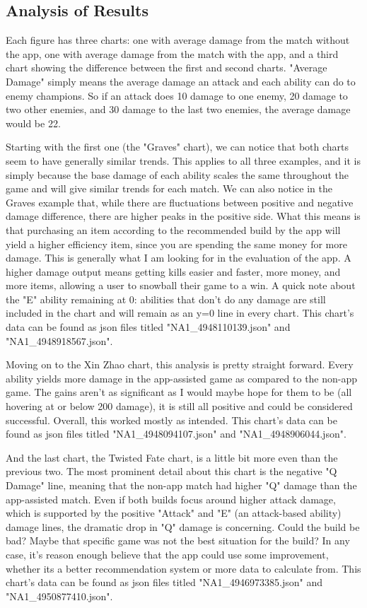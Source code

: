 \documentclass[10pt,twocolumn]{article}
\begin{document}
\subsection{Analysis of Results}
Each figure has three charts: one with average damage from the match without the app, one with average damage from the match with the app, and a third chart showing the difference between the first and second charts.
"Average Damage" simply means the average damage an attack and each ability can do to enemy champions.
So if an attack does 10 damage to one enemy, 20 damage to two other enemies, and 30 damage to the last two enemies, the average damage would be 22.

Starting with the first one (the "Graves" chart), we can notice that both charts seem to have generally similar trends.
This applies to all three examples, and it is simply because the base damage of each ability scales the same throughout the game and will give similar trends for each match.
We can also notice in the Graves example that, while there are fluctuations between positive and negative damage difference, there are higher peaks in the positive side.
What this means is that purchasing an item according to the recommended build by the app will yield a higher efficiency item, since you are spending the same money for more damage.
This is generally what I am looking for in the evaluation of the app.
A higher damage output means getting kills easier and faster, more money, and more items, allowing a user to snowball their game to a win.
A quick note about the "E" ability remaining at 0: abilities that don't do any damage are still included in the chart and will remain as an y=0 line in every chart.
This chart's data can be found as json files titled "NA1\_4948110139.json" and "NA1\_4948918567.json".

Moving on to the Xin Zhao chart, this analysis is pretty straight forward.
Every ability yields more damage in the app-assisted game as compared to the non-app game.
The gains aren't as significant as I would maybe hope for them to be (all hovering at or below 200 damage), it is still all positive and could be considered successful.
Overall, this worked mostly as intended.
This chart's data can be found as json files titled "NA1\_4948094107.json" and "NA1\_4948906044.json".

And the last chart, the Twisted Fate chart, is a little bit more even than the previous two.
The most prominent detail about this chart is the negative "Q Damage" line, meaning that the non-app match had higher "Q" damage than the app-assisted match.
Even if both builds focus around higher attack damage, which is supported by the positive "Attack" and "E" (an attack-based ability) damage lines, the dramatic drop in "Q" damage is concerning.
Could the build be bad?
Maybe that specific game was not the best situation for the build?
In any case, it's reason enough believe that the app could use some improvement, whether its a better recommendation system or more data to calculate from.
This chart's data can be found as json files titled "NA1\_4946973385.json" and "NA1\_4950877410.json".
\end{document}
